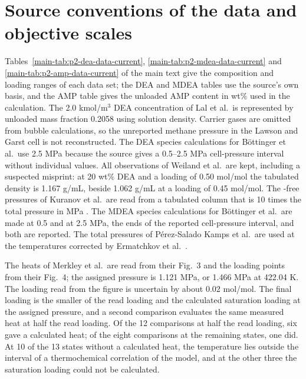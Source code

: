 \section{Source conventions of the data and objective scales}\label{sec:p2-s-observations}
Tables~\ref{main-tab:p2-dea-data-current}, \ref{main-tab:p2-mdea-data-current} and \ref{main-tab:p2-amp-data-current} of the main text give the composition and loading ranges of each data set; the DEA and MDEA tables use the source's own basis, and the AMP table gives the unloaded AMP content in wt\% used in the calculation.
The 2.0 kmol/m$^3$ DEA concentration of Lal et al.\ is represented by unloaded mass fraction 0.2058 using solution density.
Carrier gases are omitted from bubble calculations, so the unreported methane pressure in the Lawson and Garst cell is not reconstructed.
The DEA species calculations for B\"ottinger et al.\ use 2.5 MPa because the source gives a 0.5--2.5 MPa cell-pressure interval without individual values.
All observations of Weiland et al.\ are kept, including a suspected misprint: at 20 wt\% DEA and a loading of 0.50 mol/mol the tabulated density is 1.167 g/mL, beside 1.062 g/mL at a loading of 0.45 mol/mol.
The \COtwo-free pressures of Kuranov et al.\ are read from a tabulated column that is 10 times the total pressure in MPa \cite[Table~2, p.~1960]{kuranovSolubilitySingleGases1996}.
The MDEA species calculations for B\"ottinger et al.\ are made at 0.5 and at 2.5 MPa, the ends of the reported cell-pressure interval, and both are reported.
The total pressures of P\'erez-Salado Kamps et al.\ are used at the temperatures corrected by Ermatchkov et al.\ \cite[Table~6, p.~6088]{ermatchkovSolubilityCarbonDioxide2006}.

The heats of Merkley et al.\ are read from their Fig.~3 and the loading points from their Fig.~4; the assigned pressure is 1.121 MPa, or 1.466 MPa at 422.04 K.
The loading read from the figure is uncertain by about 0.02 mol/mol.
The final loading is the smaller of the read loading and the calculated saturation loading at the assigned pressure, and a second comparison evaluates the same measured heat at half the read loading.
Of the 12 comparisons at half the read loading, six gave a calculated heat; of the eight comparisons at the remaining states, one did.
At 10 of the 13 states without a calculated heat, the temperature lies outside the interval of a thermochemical correlation of the model, and at the other three the saturation loading could not be calculated.

